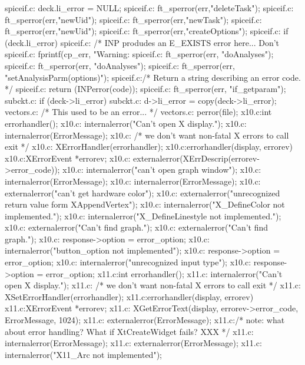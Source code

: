 {{{{{spiceif.c:        deck.li_error = NULL;
spiceif.c:                ft_sperror(err,"deleteTask");
spiceif.c:            ft_sperror(err,"newUid");
spiceif.c:            ft_sperror(err,"newTask");
spiceif.c:                ft_sperror(err,"newUid");
spiceif.c:                ft_sperror(err,"createOptions");
spiceif.c:        if (deck.li_error) {
spiceif.c:            /* INP produdes an E_EXISTS error here... Don't
spiceif.c:            fprintf(cp_err, "Warning: %
spiceif.c:            ft_sperror(err, "doAnalyses");
spiceif.c:            ft_sperror(err, "doAnalyses");
spiceif.c:        ft_sperror(err, "setAnalysisParm(options)");
spiceif.c:/* Return a string describing an error code. */
spiceif.c:    return (INPerror(code));
spiceif.c:        ft_sperror(err, "if_getparam");
subckt.c:        if (deck->li_error)
subckt.c:            d->li_error = copy(deck->li_error);
vectors.c:                /* This used to be an error... */
vectors.c:        perror(file);
x10.c:int errorhandler();
x10.c:      internalerror("Can't open X display.");
x10.c:      internalerror(ErrorMessage);
x10.c:    /* we don't want non-fatal X errors to call exit */
x10.c:    XErrorHandler(errorhandler);
x10.c:errorhandler(display, errorev)
x10.c:XErrorEvent *errorev;
x10.c:    externalerror(XErrDescrip(errorev->error_code));
x10.c:      internalerror("can't open graph window");
x10.c:      internalerror(ErrorMessage);
x10.c:        internalerror(ErrorMessage);
x10.c:        externalerror("can't get hardware color");
x10.c:        externalerror("unrecognized return value form XAppendVertex");
x10.c:    internalerror("X_DefineColor not implemented.");
x10.c:    internalerror("X_DefineLinestyle not implemented.");
x10.c:      externalerror("Can't find graph.");
x10.c:          externalerror("Can't find graph.");
x10.c:          response->option = error_option;
x10.c:        internalerror("button_option not implemented");
x10.c:        response->option = error_option;
x10.c:        internalerror("unrecognized input type");
x10.c:        response->option = error_option;
x11.c:int errorhandler();
x11.c:	  internalerror("Can't open X display.");
x11.c:	/* we don't want non-fatal X errors to call exit */
x11.c:	XSetErrorHandler(errorhandler);
x11.c:errorhandler(display, errorev)
x11.c:XErrorEvent *errorev;
x11.c:	XGetErrorText(display, errorev->error_code, ErrorMessage, 1024);
x11.c:	externalerror(ErrorMessage);
x11.c:/* note: what about error handling?  What if XtCreateWidget fails? XXX */
x11.c:	  internalerror(ErrorMessage);
x11.c:	    externalerror(ErrorMessage);
x11.c:	internalerror("X11_Arc not implemented");
}}}}}}
